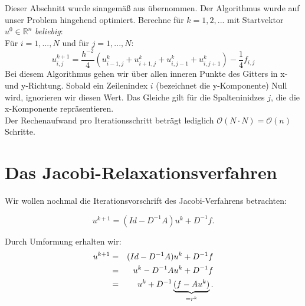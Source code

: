 Dieser Abschnitt wurde sinngemäß aus \cite{ALO2} übernommen. Der Algorithmus wurde auf unser Problem hingehend optimiert.
Berechne für $k = 1,2,...$ mit Startvektor $u^{0} \in \mathbb{R}^{n}$ \textit{beliebig}:\\
Für $i = 1,...,N$ und für $j = 1,...,N$:
\begin{equation}
u^{k+1}_{i,j} = \frac{h^{-2}}{4} (u^{k}_{i-1,j} + u^{k}_{i+1,j} + u^{k}_{i,j-1} + u^{k}_{i,j+1}) - \frac{1}{4} f_{i,j}
\end{equation}
Bei diesem Algorithmus gehen wir über allen inneren Punkte des Gitters in x- und y-Richtung. Sobald ein Zeilenindex $i$ (bezeichnet die y-Komponente) Null wird, ignorieren wir diesen Wert. Das Gleiche gilt für die Spalteninidzes $j$, die die x-Komponente repräsentieren.\\
Der Rechenaufwand pro Iterationsschritt beträgt lediglich $\mathcal{O}(N \cdot N)=\mathcal{O}(n)$ Schritte.

\section{Das Jacobi-Relaxationsverfahren}\label{s.Jacobi Relaxation}

Wir wollen nochmal die Iterationsvorschrift des Jacobi-Verfahrens betrachten:

\begin{equation}
u^{k+1} = (Id - D^{-1}A)u^{k} + D^{-1}f.
\end{equation}

Durch Umformung erhalten wir:
\begin{eqnarray}
u^{k+1} &=& (Id - D^{-1}A)u^{k} + D^{-1}f \notag \\
&=& u^{k} - D^{-1}Au^{k} + D^{-1}f \notag \\
&=& u^{k} + D^{-1} \underbrace{(f - Au^{k})}_{= r^{k}}.
\end{eqnarray}

